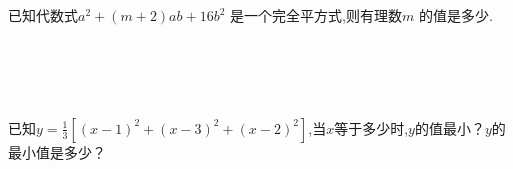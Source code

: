 \item {
    已知代数式$a^2 + (m+2)ab+ 16b^2$ 是一个完全平方式,则有理数$m$ 的值是多少.
    \ifshowSolution
        \fangsong{}
        \\
    \else
        \\ \\ \\ \\ 
    \fi
}

\item {
    已知$y=\frac13 [(x - 1)^2 + (x - 3)^2 + (x - 2)^2]$,当$x$等于多少时,$y$的值最小？$y$的最小值是多少？
    \ifshowSolution
        \fangsong{}
        \\
    \else
        \\ \\ \\ \\ 
    \fi
}